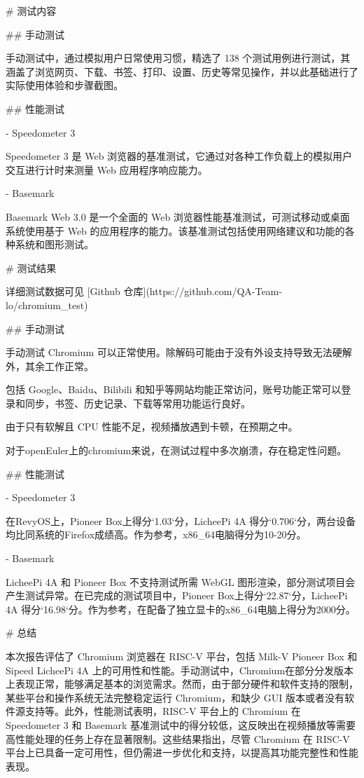\documentclass{article}
\begin{document}
\begin{markdown}
# 测试内容

## 手动测试

手动测试中，通过模拟用户日常使用习惯，精选了 138 个测试用例进行测试，其涵盖了浏览网页、下载、书签、打印、设置、历史等常见操作，并以此基础进行了实际使用体验和步骤截图。

## 性能测试

- Speedometer 3

Speedometer 3 是 Web 浏览器的基准测试，它通过对各种工作负载上的模拟用户交互进行计时来测量 Web 应用程序响应能力。

- Basemark

Basemark Web 3.0 是一个全面的 Web 浏览器性能基准测试，可测试移动或桌面系统使用基于 Web 的应用程序的能力。该基准测试包括使用网络建议和功能的各种系统和图形测试。

# 测试结果

详细测试数据可见 [Github 仓库](https://github.com/QA-Team-lo/chromium_test)

## 手动测试

手动测试 Chromium 可以正常使用。除解码可能由于没有外设支持导致无法硬解外，其余工作正常。

包括 Google、Baidu、Bilibili 和知乎等网站均能正常访问，账号功能正常可以登录和同步，书签、历史记录、下载等常用功能运行良好。

由于只有软解且 CPU 性能不足，视频播放遇到卡顿，在预期之中。

对于openEuler上的chromium来说，在测试过程中多次崩溃，存在稳定性问题。

## 性能测试

- Speedometer 3

在RevyOS上，Pioneer Box上得分`1.03`分，LicheePi 4A 得分`0.706`分，两台设备均比同系统的Firefox成绩高。作为参考，x86_64电脑得分为10-20分。

- Basemark

LicheePi 4A 和 Pioneer Box 不支持测试所需 WebGL 图形渲染，部分测试项目会产生测试异常。在已完成的测试项目中，Pioneer Box上得分`22.87`分，LicheePi 4A 得分`16.98`分。作为参考，在配备了独立显卡的x86_64电脑上得分为2000分。

# 总结

本次报告评估了 Chromium 浏览器在 RISC-V 平台，包括 Milk-V Pioneer Box 和 Sipeed LicheePi 4A 上的可用性和性能。手动测试中，Chromium在部分分发版本上表现正常，能够满足基本的浏览需求。然而，由于部分硬件和软件支持的限制，某些平台和操作系统无法完整稳定运行 Chromium，和缺少 GUI 版本或者没有软件源支持等。此外，性能测试表明，RISC-V 平台上的 Chromium 在 Speedometer 3 和 Basemark 基准测试中的得分较低，这反映出在视频播放等需要高性能处理的任务上存在显著限制。这些结果指出，尽管 Chromium 在 RISC-V 平台上已具备一定可用性，但仍需进一步优化和支持，以提高其功能完整性和性能表现。

\end{markdown}
\end{document}
